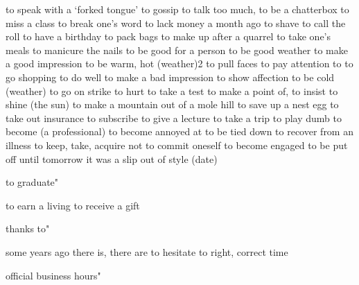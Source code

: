 {{{  
{to speak with a ‘forked tongue’}
{to gossip}
{to talk too much, to be a chatterbox}
{to miss a class}
{to break one’s word}
{to lack money}
{a month ago}
{to shave}
{to call the roll}
{to have a birthday}
{to pack bags}
{to make up after a quarrel}
{to take one’s meals}
{to manicure the nails}
{to be good for a person}
{to be good weather}
{to make a good impression}
{to be warm, hot (weather)2}
{to pull faces}
{to pay attention to}
{to go shopping}
{to do well}
{to make a bad impression}
{to show affection}
{to be cold (weather)}
{to go on strike}
{to hurt}
{to take a test}
{to make a point of, to insist}
{to shine (the sun)}
{to make a mountain out of a mole hill}
{to save up a nest egg}
{to take out insurance}
{to subscribe}
{to give a lecture}
{to take a trip}
{to play dumb}
{to become (a professional)}
{to become annoyed at}
{to be tied down}
{to recover from an illness}
{to keep, take, acquire}
{not to commit oneself}
{to become engaged}
{to be put off until tomorrow}
{it was a slip}
{out of style (date)}
{to graduate"

{to earn a living}
{to receive a gift}
{thanks to"

{some years ago}
{there is, there are}
{to hesitate to}
{right, correct time}
{official business hours"

}}}}}}
